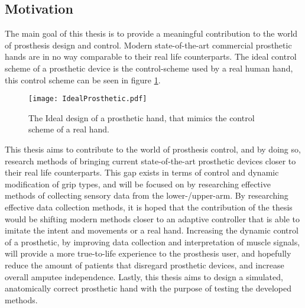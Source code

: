 \documentclass[../main.tex]{subfiles}
\begin{document}
\subsection{Motivation}

The main goal of this thesis is to provide a meaningful contribution to the world of prosthesis design and control.
Modern state-of-the-art commercial prosthetic hands are in no way comparable to their real life counterparts.
The ideal control scheme of a prosthetic device is the control-scheme used by a real human hand, this control scheme can be seen in figure \ref{fig:idealprosthetic}.

\begin{figure}[h]
\begin{center}
\texttt{[image: IdealProsthetic.pdf]}
\caption{The Ideal design of a prosthetic hand, that mimics the control scheme of a real hand.}
\label{fig:idealprosthetic}
\end{center}
\end{figure}


This thesis aims to contribute to the world of prosthesis control, and by doing so, research methods of bringing current state-of-the-art prosthetic devices closer to their real life counterparts.
This gap exists in terms of control and dynamic modification of grip types, and will be focused on by researching effective methods of collecting sensory data from the lower-/upper-arm.
By researching effective data collection methods, it is hoped that the contribution of the thesis would be shifting modern methods closer to an adaptive controller that is able to imitate the intent and movements or a real hand.
Increasing the dynamic control of a prosthetic, by improving data collection and interpretation of  muscle signals, will provide a more true-to-life experience to the prosthesis user, and hopefully reduce the amount of patients that disregard prosthetic devices, and increase overall amputee independence.
Lastly, this thesis aims to design a simulated, anatomically correct prosthetic hand with the purpose of testing the developed methods.
\end{document}

